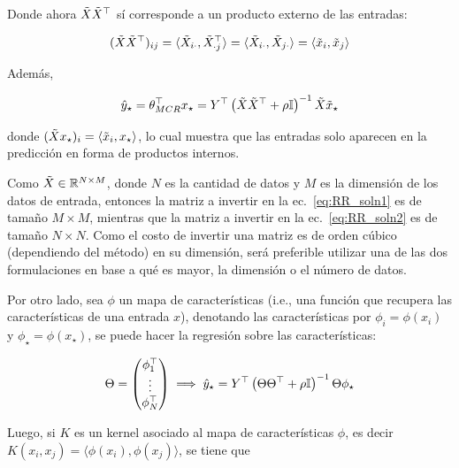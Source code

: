 Donde ahora $\tilde{X}\tilde{X}^\top$ sí corresponde a un producto externo de las entradas:

\begin{equation}
    (\tilde{X}\tilde{X}^\top)_{ij}=\langle\tilde{X}_{i\cdot},\tilde{X}^\top_{\cdot j}\rangle=\langle\tilde{X}_{i\cdot},\tilde{X}_{j\cdot}\rangle = \langle \tilde{x}_i,\tilde{x}_j\rangle
\end{equation}

Además,

\begin{equation}
    \hat{y}_\star = \theta_{MCR}^\top x_\star = Y^\top \left(\tilde{X}\tilde{X}^\top + \rho{\mathbb I}\right)^{-1}\tilde{X} \tilde{x}_\star
\end{equation}

donde $(\tilde{X} x_\star)_i = \langle \tilde{x}_i,x_\star\rangle$, lo cual muestra que las entradas solo aparecen en la predicción en forma de productos internos.

\begin{remark}
Como $\tilde{X}\in\mathbb{R}^{N\times M}$, donde $N$ es la cantidad de datos y $M$ es la dimensión de los datos de entrada, entonces la matriz a invertir en la ec.~\eqref{eq:RR_soln1} es de tamaño $M\times M$, mientras que la matriz a invertir en la ec.~\eqref{eq:RR_soln2} es de tamaño $N\times N$. Como el costo de invertir una matriz es de orden cúbico (dependiendo del método) en su dimensión, será preferible utilizar una de las dos formulaciones en base a qué es mayor, la dimensión o el número de datos. 
\end{remark}

Por otro lado, sea $\phi$ un mapa de características (i.e., una función que recupera las características de una entrada $x$), denotando las características por $\phi_i=\phi(x_i)$ y $\phi_\star = \phi(x_\star)$, se puede hacer la regresión sobre las características:

\begin{equation}
    \Theta=\left(\begin{matrix}
        \phi_1^\top\\
        \vdots\\
        \phi_N^\top
    \end{matrix}\right) \implies \hat{y}_\star = Y^\top \left(\Theta\Theta^\top + \rho{\mathbb I}\right)^{-1}\Theta \phi_\star
\end{equation}

Luego, si $K$ es un kernel asociado al mapa de características $\phi$, es decir $K(x_i,x_j)=\langle\phi(x_i),\phi(x_j)\rangle$, se tiene que


